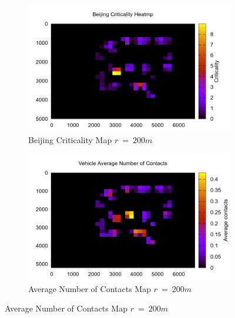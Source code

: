 \begin{figure}[h]
	\begin{subfigure}[t]{0.5\textwidth}
 		\includegraphics[width=\textwidth]{img/Beijing/criticality3_sim_Beijing3_300s_200m}
 		\caption{Beijing Criticality Map $r\ =\ 200m$}
 		\label{fig:Beijing_criticality_300s_200m}
 	\end{subfigure}%
 	\hfill
 	\begin{subfigure}[t]{0.5\textwidth}
 		\includegraphics[width=\textwidth]{img/Beijing/avgContacts_sim_Beijing3_300s_200m}
 		\caption{Average Number of Contacts Map $r\ =\ 200m$}
 		\label{fig:Beijing_avg_300s_200m}
 	\end{subfigure}

\end{figure}
